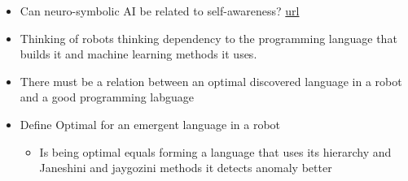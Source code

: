 \begin{itemize}
        \item Can neuro-symbolic AI be related to self-awareness? \href{https://en.wikipedia.org/wiki/Neuro-symbolic_AI}{url}
        \item Thinking of robots thinking dependency to the programming language that builds it and machine learning methods it uses.
        \item There must be a relation between an optimal discovered language in a robot and a good programming labguage
        \item Define Optimal for an emergent language in a robot
            \begin{itemize}
                \item Is being optimal equals forming a language that uses its hierarchy and Janeshini and jaygozini methods it detects anomaly better
            \end{itemize}
    \end{itemize}